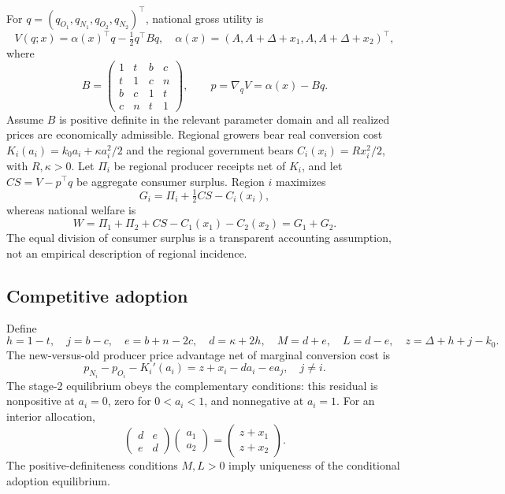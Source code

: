 \documentclass[11pt,a4paper]{article}
\begin{document}
For $q=(q_{O_1},q_{N_1},q_{O_2},q_{N_2})^\top$, national gross utility is
\begin{equation}
 V(q;x)=\alpha(x)^\top q-\tfrac12q^\top Bq,\quad
 \alpha(x)=(A,A+\Delta+x_1,A,A+\Delta+x_2)^\top,
 \label{eq:utility}
\end{equation}
where
\begin{equation}
 B=\begin{pmatrix}
 1&t&b&c\\ t&1&c&n\\ b&c&1&t\\ c&n&t&1
 \end{pmatrix},\qquad p=\nabla_q V=\alpha(x)-Bq.
 \label{eq:demand}
\end{equation}
Assume $B$ is positive definite in the relevant parameter domain and all realized prices are economically admissible. Regional growers bear real conversion cost $K_i(a_i)=k_0a_i+\kappa a_i^2/2$ and the regional government bears $C_i(x_i)=Rx_i^2/2$, with $R,\kappa>0$. Let $\Pi_i$ be regional producer receipts net of $K_i$, and let $CS=V-p^\top q$ be aggregate consumer surplus. Region $i$ maximizes
\begin{equation}
 G_i=\Pi_i+\tfrac12 CS-C_i(x_i),
 \label{eq:local}
\end{equation}
whereas national welfare is
\begin{equation}
 W=\Pi_1+\Pi_2+CS-C_1(x_1)-C_2(x_2)=G_1+G_2.
 \label{eq:welfare}
\end{equation}
The equal division of consumer surplus is a transparent accounting assumption, not an empirical description of regional incidence.

\subsection{Competitive adoption}
Define
\begin{equation}
 h=1-t,\quad j=b-c,\quad e=b+n-2c,\quad
 d=\kappa+2h,\quad M=d+e,\quad L=d-e,\quad
 z=\Delta+h+j-k_0.
 \label{eq:notation}
\end{equation}
The new-versus-old producer price advantage net of marginal conversion cost is
\begin{equation}
 p_{N_i}-p_{O_i}-K_i'(a_i)=z+x_i-d a_i-e a_j,\quad j\ne i.
 \label{eq:adoptionfoc}
\end{equation}
The stage-2 equilibrium obeys the complementary conditions: this residual is nonpositive at $a_i=0$, zero for $0<a_i<1$, and nonnegative at $a_i=1$. For an interior allocation,
\begin{equation}
 \begin{pmatrix}d&e\\e&d\end{pmatrix}
 \begin{pmatrix}a_1\\a_2\end{pmatrix}
 =\begin{pmatrix}z+x_1\\z+x_2\end{pmatrix}.
 \label{eq:adoptionmatrix}
\end{equation}
The positive-definiteness conditions $M,L>0$ imply uniqueness of the conditional adoption equilibrium.
\end{document}
